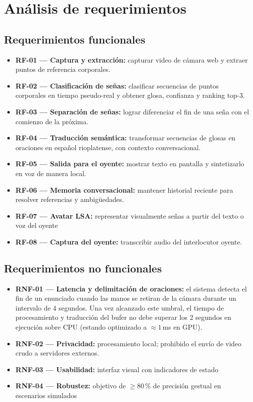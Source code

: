 \documentclass[12pt,a4paper]{report}
\begin{document}
\chapter{Análisis de requerimientos}
\section{Requerimientos funcionales}
\begin{itemize}
    \item \textbf{RF-01 --- Captura y extracción:} capturar video de cámara web y extraer puntos de referencia corporales.
    \item \textbf{RF-02 --- Clasificación de señas:} clasificar secuencias de puntos corporales en tiempo pseudo-real y obtener glosa, confianza y ranking top-3.
    \item \textbf{RF-03 --- Separación de señas:} lograr diferenciar el fin de una seña con el comienzo de la próxima.
    \item \textbf{RF-04 --- Traducción semántica:} transformar secuencias de glosas en oraciones en español rioplatense, con contexto conversacional.
    \item \textbf{RF-05 --- Salida para el oyente:} mostrar texto en pantalla y sintetizarlo en voz de manera local.
    \item \textbf{RF-06 --- Memoria conversacional:} mantener historial reciente para resolver referencias y ambigüedades.
    \item \textbf{RF-07 --- Avatar LSA:} representar visualmente señas a partir del texto o voz del oyente
    \item \textbf{RF-08 --- Captura del oyente:} transcribir audio del interlocutor oyente.
\end{itemize}

\section{Requerimientos no funcionales}
\begin{itemize}
    \item \textbf{RNF-01 --- Latencia y delimitación de oraciones:} el sistema detecta el fin de un enunciado cuando las manos se retiran de la cámara durante un intervalo de 4 segundos. Una vez alcanzado este umbral, el tiempo de procesamiento y traducción del bufer no debe superar los 2 segundos en ejecución sobre CPU (estando optimizado a $\approx 1$\,ms en GPU).
    \item \textbf{RNF-02 --- Privacidad:} procesamiento local; prohibido el envío de video crudo a servidores externos.
    \item \textbf{RNF-03 --- Usabilidad:} interfaz visual con indicadores de estado
    \item \textbf{RNF-04 --- Robustez:} objetivo de $\geq$80\,\% de precisión gestual en escenarios simulados
\end{itemize}
\end{document}
